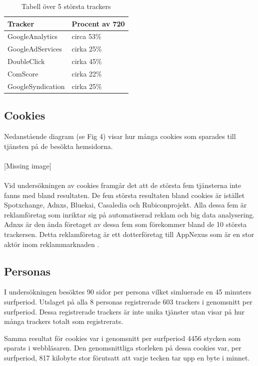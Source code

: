\documentclass[a4paper,11pt]{article}
\begin{document}
{\begin{table}
\begin{center}
    \caption{Tabell över 5 största trackers}
   \begin{tabular}{| l | l |}
   \hline
   Tracker & Procent av 720 \\ \hline
   GoogleAnalytics & circa 53\% \\ \hline
   GoogleAdServices & cirka 25\% \\ \hline
    DoubleClick & cirka 45\% \\ \hline
    ComScore & cirka 22\% \\ \hline
    GoogleSyndication & cirka 25\% \\ \hline
   \end{tabular}
\end{center}
\end{table}

\subsection{Cookies}
Nedanstående diagram (se Fig 4) visar hur många cookies som sparades till tjänsten på de besökta hemsidorna. \\\\

[Missing image] \\\\

Vid undersökningen av cookies framgår det att de största fem tjänsterna inte fanns med bland resultaten. De fem största resultaten bland cookies är istället Spotxchange, Adnxs, Bluekai, Casaledia och Rubiconprojekt.  Alla dessa fem är reklamföretag som inriktar sig på automatiserad reklam och big data analysering. Adnxs är den ända företaget av dessa fem som förekommer bland de 10 största trackersen. Detta reklamföretag är ett dotterföretag till AppNexus som är en stor aktör inom reklammarknaden \cite{Guardian}.

\subsection{Personas}
I undersökningen besöktes 90 sidor per persona vilket simluerade en 45 minuters surfperiod. Utslaget på alla 8 personas registrerade 603 trackers i genomsnitt per surfperiod. Dessa registrerade trackers är inte unika tjänster utan visar på hur många trackers totalt som registrerats.

Samma resultat för cookies var i genomsnitt per surfperiod 4456 stycken som sparats i webbläsaren. Den genomsnittliga storleken på dessa cookies var, per surfperiod, 817 kilobyte stor förutsatt att varje tecken tar upp en byte i minnet.

}
\end{document}
